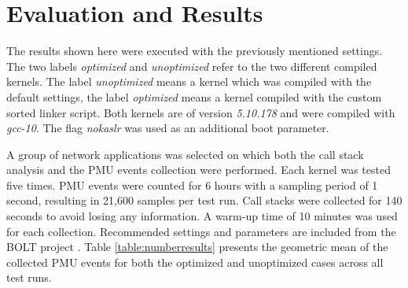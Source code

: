 \section{Evaluation and Results}\label{chapt:results}

The results shown here were executed with the previously mentioned settings. The two labels \textit{optimized} and \textit{unoptimized} refer to the two different compiled kernels. The label \textit{unoptimized} means a kernel which was compiled with the default settings, the label \textit{optimized} means a kernel compiled with the custom sorted linker script. Both kernels are of version \textit{5.10.178} and were compiled with \textit{gcc-10}. The flag \textit{nokaslr} was used as an additional boot parameter.

A group of network applications was selected on which both the call stack analysis and the PMU events collection were performed. Each kernel was tested five times. PMU events were counted for 6 hours with a sampling period of 1 second, resulting in 21,600 samples per test run. Call stacks were collected for 140 seconds to avoid losing any information. A warm-up time of 10 minutes was used for each collection. Recommended settings and parameters are included from the BOLT project \cite{llvm-bolt}. Table \ref{table:numberresults} presents the geometric mean of the collected PMU events for both the optimized and unoptimized cases across all test runs.

